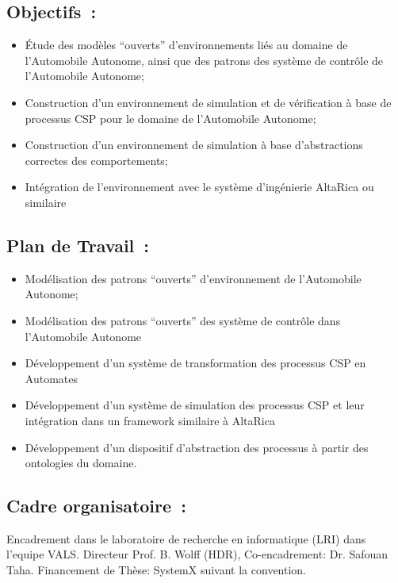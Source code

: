 \documentclass[a4paper,10pt]{article}
\begin{document}
\subsection*{Objectifs~:}
\begin{itemize}
\item Étude des modèles ``ouverts''  d'environnements
         liés au domaine de l'Automobile Autonome, ainsi que des patrons
         des système de contrôle de l'Automobile Autonome;
\item Construction d'un environnement de simulation et de vérification à base de
         processus CSP pour le domaine  de l'Automobile Autonome;
\item Construction d'un environnement de simulation à base d'abstractions correctes des comportements;
\item Intégration de l'environnement avec le système d'ingénierie AltaRica ou similaire
\end{itemize}

\subsection*{Plan de Travail~:}
\begin{itemize}
\item Modélisation des patrons ``ouverts''  d'environnement de l'Automobile Autonome;
\item Modélisation des patrons ``ouverts'' des système de contrôle dans l'Automobile Autonome
\item Développement d'un système de transformation des processus CSP en Automates
\item Développement d'un système de simulation des processus CSP et leur intégration dans un framework similaire à AltaRica
\item Développement d'un dispositif d'abstraction des processus à partir des ontologies du domaine.
\end{itemize}

\subsection*{Cadre organisatoire~:}
Encadrement dans le laboratoire de recherche en informatique (LRI) dans l'equipe VALS.
Directeur Prof. B. Wolff (HDR), Co-encadrement: Dr. Safouan Taha.
Financement de Thèse: SystemX suivant la convention. 



\end{document}
